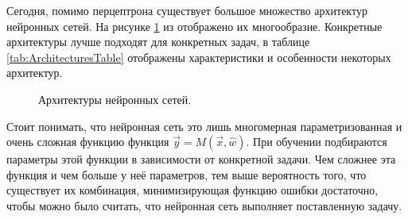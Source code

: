 \par
Сегодня, помимо перцептрона существует большое множество архитектур нейронных сетей. На рисунке \ref{ris:NNArchitectures} из \cite{leijnen2020neural} отображено их многообразие. Конкретные архитектуры лучше подходят для конкретных задач, в таблице \ref{tab:ArchitecturesTable} отображены характеристики и особенности некоторых архитектур. 
\begin{figure}[h]
	\caption{Архитектуры нейронных сетей.}
	\label{ris:NNArchitectures}
\end{figure}

\par
Стоит понимать, что нейронная сеть это лишь многомерная параметризованная и очень сложная функцию функция $\vec{y} = M(\vec{x}, \hat{w})$. При обучении подбираются параметры этой функции в зависимости от конкретной задачи. Чем сложнее эта функция и чем больше у неё параметров, тем выше вероятность того, что существует их комбинация, минимизирующая функцию ошибки достаточно, чтобы можно было считать, что нейронная сеть выполняет поставленную задачу.

